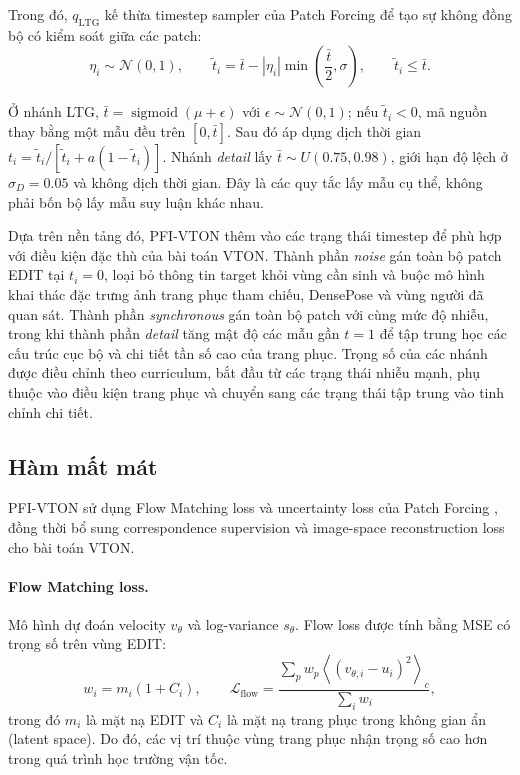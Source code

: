 \documentclass[11pt,a4paper]{article}
\newcommand{\Loss}{\mathcal{L}}
\begin{document}
Trong đó, \(q_{\mathrm{LTG}}\) kế thừa timestep sampler của Patch Forcing để tạo sự không đồng bộ có kiểm soát giữa các patch:
\begin{equation}
\eta_i\sim\mathcal N(0,1),\qquad \widetilde t_i=\bar t-|\eta_i|\min\left(\frac{\bar t}{2},\sigma\right),\qquad \widetilde t_i\leq\bar t.
\label{eq:ltg}
\end{equation}

Ở nhánh LTG, \(\bar t=\operatorname{sigmoid}(\mu+\epsilon)\) với \(\epsilon\sim\mathcal N(0,1)\); nếu \(\widetilde t_i<0\), mã nguồn thay bằng một mẫu đều trên \([0,\bar t]\). Sau đó áp dụng dịch thời gian \(t_i=\widetilde t_i/[\widetilde t_i+a(1-\widetilde t_i)]\). Nhánh \textit{detail} lấy \(\bar t\sim U(0.75,0.98)\), giới hạn độ lệch ở \(\sigma_D=0.05\) và không dịch thời gian. Đây là các quy tắc lấy mẫu cụ thể, không phải bốn bộ lấy mẫu suy luận khác nhau.

Dựa trên nền tảng đó, PFI-VTON thêm vào các trạng thái timestep để phù hợp với điều kiện đặc thù của bài toán VTON. Thành phần \textit{noise} gán toàn bộ patch EDIT tại \(t_i=0\), loại bỏ thông tin target khỏi vùng cần sinh và buộc mô hình khai thác đặc trưng ảnh trang phục tham chiếu, DensePose và vùng người đã quan sát. Thành phần \textit{synchronous} gán toàn bộ patch với cùng mức độ nhiễu, trong khi thành phần \textit{detail} tăng mật độ các mẫu gần \(t=1\) để tập trung học các cấu trúc cục bộ và chi tiết tần số cao của trang phục. Trọng số của các nhánh được điều chỉnh theo curriculum, bắt đầu từ các trạng thái nhiễu mạnh, phụ thuộc vào điều kiện trang phục và chuyển sang các trạng thái tập trung vào tinh chỉnh chi tiết.

\subsection{Hàm mất mát}

PFI-VTON sử dụng Flow Matching loss và uncertainty loss của Patch Forcing \cite{pf}, đồng thời bổ sung correspondence supervision và image-space reconstruction loss cho bài toán VTON.

\paragraph{Flow Matching loss.}
Mô hình dự đoán velocity \(v_\theta\) và log-variance \(s_\theta\). Flow loss được tính bằng MSE có trọng số trên vùng EDIT:
\begin{equation}
w_i=m_i(1+C_i),\qquad \Loss_{\mathrm{flow}} = \frac{\sum_p w_p \left\langle (v_{\theta,i}-u_i)^2 \right\rangle_c} {\sum_i w_i},
\end{equation}
trong đó \(m_i\) là mặt nạ EDIT và \(C_i\) là mặt nạ trang phục trong không gian ẩn (latent space). Do đó, các vị trí thuộc vùng trang phục nhận trọng số cao hơn trong quá trình học trường vận tốc.
\end{document}
